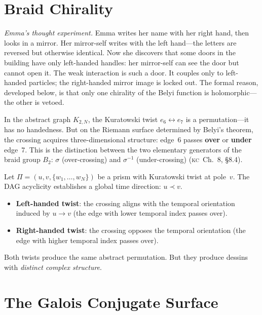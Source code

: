 \documentclass[11pt, a4paper, openany]{book}
\newcommand{\KC}[1]{\textnormal{(\textsc{kc}~#1)}}
\begin{document}
\section{Braid Chirality}\label{sec:braid-chirality}

\smallskip\noindent
\textit{Emma's thought experiment.}
Emma writes her name with her right hand, then looks in a mirror. Her
mirror-self writes with the left hand---the letters are reversed but
otherwise identical. Now she discovers that some doors in the building
have only left-handed handles: her mirror-self can see the door but
cannot open it. The weak interaction is such a door. It couples only to
left-handed particles; the right-handed mirror image is locked out. The
formal reason, developed below, is that only one chirality of the Belyi
function is holomorphic---the other is vetoed.
\smallskip

\noindent
In the abstract graph $K_{2,N}$, the Kuratowski twist
$e_6 \leftrightarrow e_7$ is a permutation---it has no handedness. But
on the Riemann surface determined by Belyi's theorem, the crossing
acquires three-dimensional structure: edge~6 passes \textbf{over} or
\textbf{under} edge~7. This is the distinction between the two
elementary generators of the braid group $B_2$: $\sigma$ (over-crossing)
and $\sigma^{-1}$ (under-crossing) \KC{Ch.~8, \S8.4}.

\begin{definition}\label{def:twist-chirality}
Let $\Pi = (u, v, \{w_1, \ldots, w_N\})$ be a prism with Kuratowski
twist at pole~$v$. The DAG acyclicity establishes a global time
direction: $u \prec v$.
\begin{itemize}
  \item \textbf{Left-handed twist}: the crossing aligns with the
    temporal orientation induced by $u \to v$ (the edge with lower
    temporal index passes over).
  \item \textbf{Right-handed twist}: the crossing opposes the
    temporal orientation (the edge with higher temporal index passes
    over).
\end{itemize}
\end{definition}

\noindent
Both twists produce the same abstract permutation. But they produce
dessins with \emph{distinct complex structure}.

\section{The Galois Conjugate Surface}\label{sec:galois}
\end{document}
